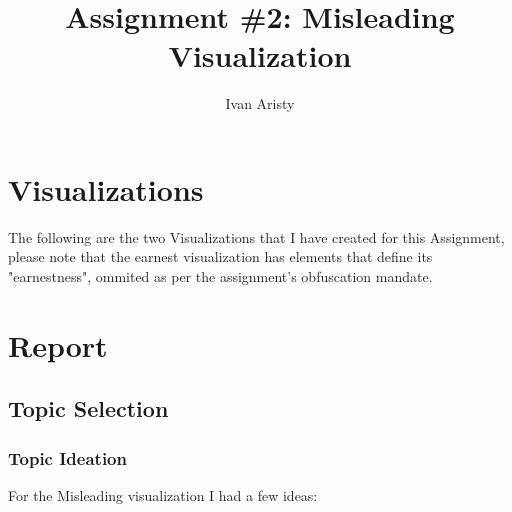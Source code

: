 \documentclass{article}
\title{Assignment \#2: Misleading Visualization}
\author{Ivan Aristy}
\begin{document}
  \maketitle %
  \thispagestyle{empty}

\section{Visualizations}
\label{sec:sec1}

The following are the two Visualizations that I have created for this Assignment, 
please note that the earnest visualization has elements that define its "earnestness",
ommited as per the assignment's obfuscation mandate.



\newpage

\section{Report}
\label{sec:sec2}

\subsection{Topic Selection}
\label{subsec:topicSelection}

\subsubsection{Topic Ideation}

For the Misleading visualization I had a few ideas:
\end{document}
